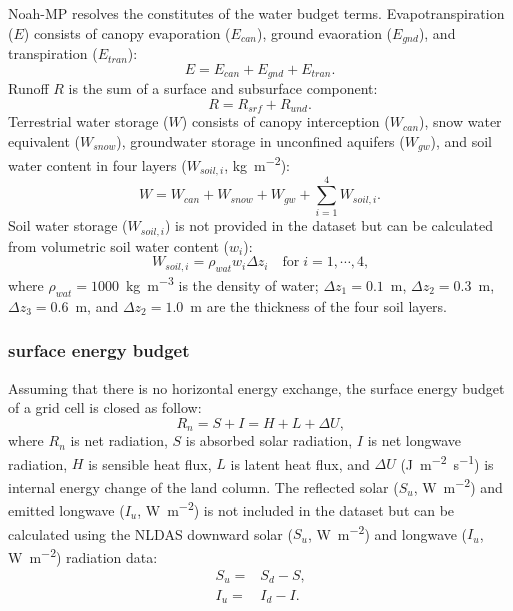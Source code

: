 \documentclass[essd]{copernicus}
\begin{document}
Noah-MP resolves the constitutes of the water budget terms. Evapotranspiration
($E$) consists of canopy evaporation ($E_{can}$), ground evaoration ($E_{gnd}$),
and transpiration ($E_{tran}$):
\begin{equation}
    E = E_{can} + E_{gnd} + E_{tran} \text{.}
\end{equation}
Runoff {$R$} is the sum of a surface and subsurface component:
\begin{equation}
    R = R_{srf} + R_{und} \text{.}
\end{equation}
Terrestrial water storage ($W$) consists of canopy interception ($W_{can}$),
snow water equivalent ($W_{snow}$), groundwater storage in unconfined aquifers
($W_{gw}$), and soil water content in four layers ($W_{soil,i}$,
\unit{kg~m^{-2}}):
\begin{equation}
    W = W_{can} + W_{snow} + W_{gw} + \sum_{i=1}^4 W_{soil,i} \text{.}
\end{equation}
Soil water storage ($W_{soil,i}$) is not provided in the dataset but can be
calculated from volumetric soil water content ($w_{i}$):
\begin{equation}
    W_{soil,i} = \rho_{wat} w_i \Delta z_i
    \quad \text{for} \; i = 1, \cdots, 4
    \text{,} \label{eq:soil-vmc}
\end{equation}
where $\rho_{wat}=1000$~\unit{kg~m^{-3}} is the density of water; $\Delta
z_1=0.1$~\unit{m}, $\Delta z_2=0.3$~\unit{m}, $\Delta z_3=0.6$~\unit{m}, and
$\Delta z_2=1.0$~\unit{m} are the thickness of the four soil layers.


\subsubsection{surface energy budget}

Assuming that there is no horizontal energy exchange, the surface energy budget
of a grid cell is closed as follow:
\begin{equation}
    R_n = S + I = H + L + \Delta U \text{,} \label{eq:energy-balance}
\end{equation}
where $R_n$ is net radiation, $S$ is absorbed solar radiation, $I$ is net
longwave radiation, $H$ is sensible heat flux, $L$ is latent heat flux, and
$\Delta U$ (\unit{J~m^{-2}~s^{-1}}) is internal energy change of the land
column. The reflected solar ($S_u$, \unit{W~m^{-2}}) and emitted longwave
($I_u$, \unit{W~m^{-2}}) is not included in the dataset but can be calculated
using the NLDAS downward solar ($S_u$, \unit{W~m^{-2}}) and
longwave ($I_u$, \unit{W~m^{-2}}) radiation data:
\begin{align}
    S_u = & S_d - S \text{,} \\
    I_u = & I_d - I \text{.}
\end{align}
\end{document}
